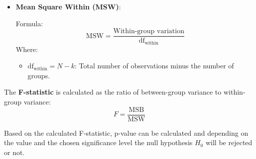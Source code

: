 \begin{itemize}
    \item \textbf{Mean Square Within (MSW)}:
    
    Formula:
    \[
    \text{MSW} = \frac{\text{Within-group \ variation}}{\text{df}_{\text{within}}}
    \]
    \noindent \noindent Where:
    \begin{itemize}
        \item \( \text{df}_{\text{within}} = N - k \): Total number of observations minus the number of groups.
    \end{itemize}
\end{itemize}


\noindent \noindent The \textbf{F-statistic} is calculated as the ratio of
between-group variance to within-group variance:
\[
F = \frac{\text{MSB}}{\text{MSW}}
\]


Based on the calculated F-statistic, p-value can be calculated and depending on
the value and the chosen significance level the null hypothesis $H_0$ will be
rejected or not.
